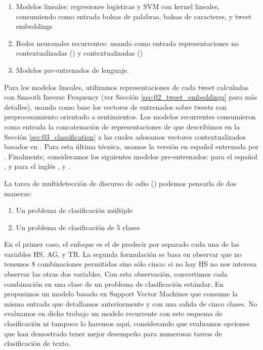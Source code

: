 \begin{enumerate}
    \item Modelos lineales: regresiones logísticas y SVM con kernel lineales, consumiendo como entrada bolsas de palabras, bolsas de caracteres, y tweet embeddings
    \item Redes neuronales recurrentes: usando como entrada representaciones no contextualizadas (\fasttext{}) y  contextualizadas (\elmo{})
    \item Modelos pre-entrenados de lenguaje.
\end{enumerate}

Para los modelos lineales, utilizamos representaciones de cada tweet calculadas con Smooth Inverse Frequency (ver Sección \ref{sec:02_tweet_embeddings} para más detalles), usando como base los vectores de \fasttext{} entrenados sobre tweets con preprocesamiento orientado a sentimientos. Los modelos recurrentes consumieron como entrada la concatenación de representaciones de \fasttext{} que describimos en la Sección \ref{sec:03_classification} a las cuales adosamos vectores contextualizados basados en \elmo{}. \cite{peters2018} Para esta última técnica, usamos la versión en español entrenada por \citet{che-EtAl:2018:K18-2}. Finalmente, consideramos los siguientes modelos pre-entrenados: para el español \beto{} \cite{canete2020spanish}, y para el inglés \bert{} \cite{devlin2018bert}, \roberta{} \cite{liu2019roberta} y \bertweet{}. \cite{dat2020bertweet}

La tarea de multidetección de discurso de odio (\subtaskb{}) podemos pensarla de dos maneras:

\begin{enumerate}
    \item Un problema de clasificación múltiple
    \item Un problema de clasificación de 5 clases
\end{enumerate}

En el primer caso, el enfoque es el de predecir por separado cada una de las variables HS, AG, y TR. La segunda formulación se basa en observar que no tenemos 8 combinaciones permitidas sino sólo cinco: si no hay HS no nos interesa observar las otras dos variables. Con esta observación, convertimos cada combinación en una clase de un problema de clasificación estándar. En \citet{perez-2019-atalaya} propusimos un modelo basado en Support Vector Machines que consume la misma entrada que detallamos anteriormente y con una salida de cinco clases. No evaluamos en dicho trabajo un modelo recurrente con este esquema de clasificación ni tampoco lo haremos aquí, considerando que evaluamos opciones que han demostrado tener mejor desempeño para numerosas tareas de clasificación de texto.

